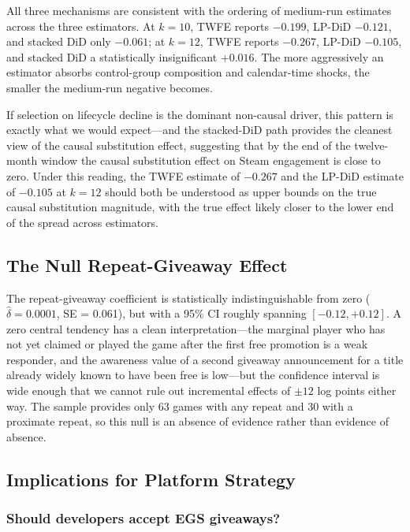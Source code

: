 \documentclass[11pt]{article}
\begin{document}
All three mechanisms are consistent with the ordering of medium-run estimates
across the three estimators. At $k = 10$, TWFE reports $-0.199$, LP-DiD $-0.121$,
and stacked DiD only $-0.061$; at $k = 12$, TWFE reports $-0.267$, LP-DiD $-0.105$,
and stacked DiD a statistically insignificant $+0.016$. The more aggressively an
estimator absorbs control-group composition and calendar-time shocks, the smaller
the medium-run negative becomes.

If selection on lifecycle decline is the dominant non-causal driver, this
pattern is exactly what we would expect---and the stacked-DiD path provides the
cleanest view of the causal substitution effect, suggesting that by the end of the
twelve-month window the causal substitution effect on Steam engagement is close
to zero. Under this reading, the TWFE estimate of $-0.267$ and the LP-DiD estimate
of $-0.105$ at $k = 12$ should both be understood as upper bounds on the true
causal substitution magnitude, with the true effect likely closer to the lower
end of the spread across estimators.

\subsection{The Null Repeat-Giveaway Effect}

The repeat-giveaway coefficient is statistically indistinguishable from zero
($\hat{\delta} = 0.0001$, SE = 0.061), but with a 95\% CI roughly spanning
$[-0.12, +0.12]$. A zero central tendency has a clean interpretation---the
marginal player who has not yet claimed or played the game after the first free
promotion is a weak responder, and the awareness value of a second giveaway
announcement for a title already widely known to have been free is low---but the
confidence interval is wide enough that we cannot rule out incremental effects of
$\pm 12$ log points either way. The sample provides only 63 games with any repeat
and 30 with a proximate repeat, so this null is an absence of evidence rather than
evidence of absence.

\subsection{Implications for Platform Strategy}

\subsubsection*{Should developers accept EGS giveaways?}
\end{document}
